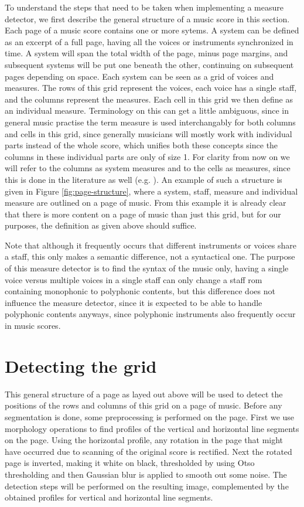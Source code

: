 To understand the steps that need to be taken when implementing a measure detector, we first describe the general structure of a music score in this section. Each page of a music score contains one or more sytems. A system can be defined as an excerpt of a full page, having all the voices or instruments synchronized in time. A system will span the total width of the page, minus page margins, and subsequent systems will be put one beneath the other, continuing on subsequent pages depending on space. Each system can be seen as a grid of voices and measures. The rows of this grid represent the voices, each voice has a single staff, and the columns represent the measures. Each cell in this grid we then define as an individual measure. Terminology on this can get a little ambiguous, since in general music practise the term measure is used interchangably for both columns and cells in this grid, since generally musicians will mostly work with individual parts instead of the whole score, which unifies both these concepts since the columns in these individual parts are only of size 1. For clarity from now on we will refer to the columns as system measures and to the cells as measures, since this is done in the literature as well (e.g. \citep{Zalkow2019}). An example of such a structure is given in Figure \ref{fig:page-structure}, where a system, staff, measure and individual measure are outlined on a page of music. From this example it is already clear that there is more content on a page of music than just this grid, but for our purposes, the definition as given above should suffice.

Note that although it frequently occurs that different instruments or voices share a staff, this only makes a semantic difference, not a syntactical one. The purpose of this measure detector is to find the syntax of the music only, having a single voice versus multiple voices in a single staff can only change a staff rom containing monophonic to polyphonic contents, but this difference does not influence the measure detector, since it is expected to be able to handle polyphonic contents anyways, since polyphonic instruments also frequently occur in music scores.

\section{Detecting the grid}\label{sec:measure-detector-detecting}
This general structure of a page as layed out above will be used to detect the positions of the rows and columns of this grid on a page of music. Before any segmentation is done, some preprocessing is performed on the page. First we use morphology operations to find profiles of the vertical and horizontal line segments on the page. Using the horizontal profile, any rotation in the page that might have occurred due to scanning of the original score is rectified. Next the rotated page is inverted, making it white on black, thresholded by using Otso thresholding \citeneeded and then Gaussian blur is applied to smooth out some noise. The detection steps will be performed on the resulting image, complemented by the obtained profiles for vertical and horizontal line segments.

